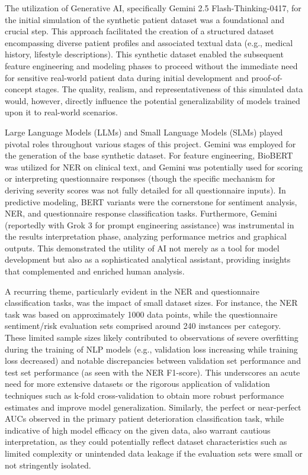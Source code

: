 The utilization of Generative AI, specifically Gemini 2.5 Flash-Thinking-0417, for the initial simulation of the synthetic patient dataset was a foundational and crucial step. This approach facilitated the creation of a structured dataset encompassing diverse patient profiles and associated textual data (e.g., medical history, lifestyle descriptions). This synthetic dataset enabled the subsequent feature engineering and modeling phases to proceed without the immediate need for sensitive real-world patient data during initial development and proof-of-concept stages. The quality, realism, and representativeness of this simulated data would, however, directly influence the potential generalizability of models trained upon it to real-world scenarios.

Large Language Models (LLMs) and Small Language Models (SLMs) played pivotal roles throughout various stages of this project. Gemini was employed for the generation of the base synthetic dataset. For feature engineering, BioBERT was utilized for NER on clinical text, and Gemini was potentially used for scoring or interpreting questionnaire responses (though the specific mechanism for deriving severity scores was not fully detailed for all questionnaire inputs). In predictive modeling, BERT variants were the cornerstone for sentiment analysis, NER, and questionnaire response classification tasks. Furthermore, Gemini (reportedly with Grok 3 for prompt engineering assistance) was instrumental in the results interpretation phase, analyzing performance metrics and graphical outputs. This demonstrated the utility of AI not merely as a tool for model development but also as a sophisticated analytical assistant, providing insights that complemented and enriched human analysis.

A recurring theme, particularly evident in the NER and questionnaire classification tasks, was the impact of small dataset sizes. For instance, the NER task was based on approximately 1000 data points, while the questionnaire sentiment/risk evaluation sets comprised around 240 instances per category. These limited sample sizes likely contributed to observations of severe overfitting during the training of NLP models (e.g., validation loss increasing while training loss decreased) and notable discrepancies between validation set performance and test set performance (as seen with the NER F1-score). This underscores an acute need for more extensive datasets or the rigorous application of validation techniques such as k-fold cross-validation to obtain more robust performance estimates and improve model generalization. Similarly, the perfect or near-perfect AUCs observed in the primary patient deterioration classification task, while indicative of high model efficacy on the given data, also warrant cautious interpretation, as they could potentially reflect dataset characteristics such as limited complexity or unintended data leakage if the evaluation sets were small or not stringently isolated.